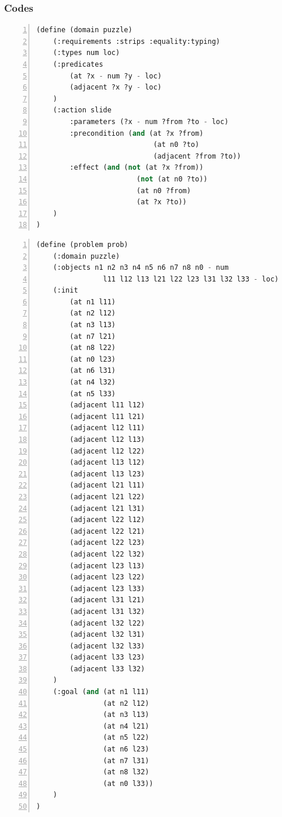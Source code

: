 ﻿\documentclass[a4paper, 11pt]{article}
\begin{document}
\subsubsection{Codes}
\begin{lstlisting}[title=domain-puzzle.pddl,frame=single,language=lisp,numbers=left]
(define (domain puzzle)
    (:requirements :strips :equality:typing)
    (:types num loc)
    (:predicates
        (at ?x - num ?y - loc)
        (adjacent ?x ?y - loc)
    )
    (:action slide
        :parameters (?x - num ?from ?to - loc)
        :precondition (and (at ?x ?from)
                            (at n0 ?to)
                            (adjacent ?from ?to))
        :effect (and (not (at ?x ?from))
                        (not (at n0 ?to))
                        (at n0 ?from)
                        (at ?x ?to))
    )
)
\end{lstlisting}
\begin{lstlisting}[title=puzzle.pddl,frame=single,language=lisp,numbers=left]
(define (problem prob)
    (:domain puzzle)
    (:objects n1 n2 n3 n4 n5 n6 n7 n8 n0 - num
                l11 l12 l13 l21 l22 l23 l31 l32 l33 - loc)
    (:init
        (at n1 l11)
        (at n2 l12)
        (at n3 l13)
        (at n7 l21)
        (at n8 l22)
        (at n0 l23)
        (at n6 l31)
        (at n4 l32)
        (at n5 l33)
        (adjacent l11 l12)
        (adjacent l11 l21)
        (adjacent l12 l11)
        (adjacent l12 l13)
        (adjacent l12 l22)
        (adjacent l13 l12)
        (adjacent l13 l23)
        (adjacent l21 l11)
        (adjacent l21 l22)
        (adjacent l21 l31)
        (adjacent l22 l12)
        (adjacent l22 l21)
        (adjacent l22 l23)
        (adjacent l22 l32)
        (adjacent l23 l13)
        (adjacent l23 l22)
        (adjacent l23 l33)
        (adjacent l31 l21)
        (adjacent l31 l32)
        (adjacent l32 l22)
        (adjacent l32 l31)
        (adjacent l32 l33)
        (adjacent l33 l23)
        (adjacent l33 l32)
    )
    (:goal (and (at n1 l11)
                (at n2 l12)
                (at n3 l13)
                (at n4 l21)
                (at n5 l22)
                (at n6 l23)
                (at n7 l31)
                (at n8 l32)
                (at n0 l33))
    )
)
\end{lstlisting}
\end{document}
